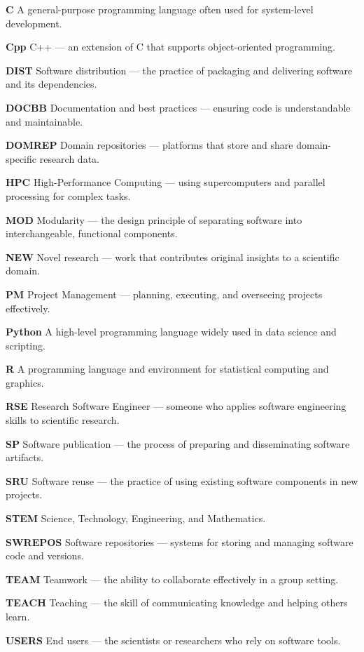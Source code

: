 \documentclass[
        english,biblatex
    ]{lni}
\begin{document}
    \textbf{C} A general-purpose programming language often used for
    system-level development.

    \textbf{Cpp} C++ --- an extension of C that supports object-oriented
    programming.

    \textbf{DIST} Software distribution --- the practice of packaging
    and delivering software and its dependencies.

    \textbf{DOCBB} Documentation and best practices --- ensuring code is
    understandable and maintainable.

    \textbf{DOMREP} Domain repositories --- platforms that store and
    share domain-specific research data.

    \textbf{HPC} High-Performance Computing --- using supercomputers and
    parallel processing for complex tasks.

    \textbf{MOD} Modularity --- the design principle of separating
    software into interchangeable, functional components.

    \textbf{NEW} Novel research --- work that contributes original
    insights to a scientific domain.

    \textbf{PM} Project Management --- planning, executing, and
    overseeing projects effectively.

    \textbf{Python} A high-level programming language widely used in
    data science and scripting.

    \textbf{R} A programming language and environment for statistical
    computing and graphics.

    \textbf{RSE} Research Software Engineer --- someone who applies
    software engineering skills to scientific research.

    \textbf{SP} Software publication --- the process of preparing and
    disseminating software artifacts.

    \textbf{SRU} Software reuse --- the practice of using existing
    software components in new projects.

    \textbf{STEM} Science, Technology, Engineering, and Mathematics.

    \textbf{SWREPOS} Software repositories --- systems for storing and
    managing software code and versions.

    \textbf{TEAM} Teamwork --- the ability to collaborate effectively in
    a group setting.

    \textbf{TEACH} Teaching --- the skill of communicating knowledge and
    helping others learn.

    \textbf{USERS} End users --- the scientists or researchers who rely
    on software tools.

\end{document}
